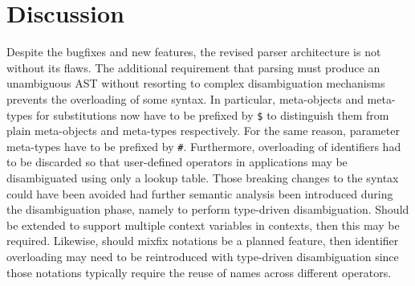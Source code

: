\section{Discussion}\label{section:parser-discussion}

Despite the bugfixes and new features, the revised parser architecture is not without its flaws.
The additional requirement that parsing must produce an unambiguous \ac{AST} without resorting to complex disambiguation mechanisms prevents the overloading of some syntax.
In particular, meta-objects and meta-types for substitutions now have to be prefixed by \texttt{\$} to distinguish them from plain meta-objects and meta-types respectively.
For the same reason, parameter meta-types have to be prefixed by \texttt{\#}.
Furthermore, overloading of identifiers had to be discarded so that user-defined operators in applications may be disambiguated using only a lookup table.
Those breaking changes to the syntax could have been avoided had further semantic analysis been introduced during the disambiguation phase, namely to perform type-driven disambiguation.
Should \Beluga be extended to support multiple context variables in contexts, then this may be required.
Likewise, should mixfix notations be a planned feature, then identifier overloading may need to be reintroduced with type-driven disambiguation since those notations typically require the reuse of names across different operators.

